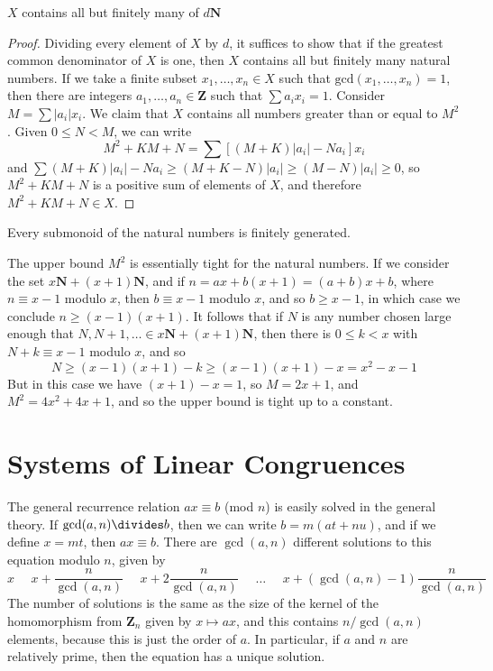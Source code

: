 \begin{theorem}
    $X$ contains all but finitely many of $d \mathbf{N}$
\end{theorem}
\begin{proof}
    Dividing every element of $X$ by $d$, it suffices to show that if the greatest common denominator of $X$ is one, then $X$ contains all but finitely many natural numbers. If we take a finite subset $x_1, \dots, x_n \in X$ such that $\text{gcd}(x_1, \dots, x_n) = 1$, then there are integers $a_1, \dots, a_n \in \mathbf{Z}$ such that $\sum a_ix_i = 1$. Consider $M = \sum |a_i|x_i$. We claim that $X$ contains all numbers greater than or equal to $M^2$. Given $0 \leq N < M$, we can write
    \[ M^2 + KM + N = \sum \left[ (M+K)|a_i| - Na_i \right] x_i \]
    and $\sum (M+K)|a_i| - Na_i \geq (M+K-N)|a_i| \geq (M-N)|a_i| \geq 0$, so $M^2 + KM + N$ is a positive sum of elements of $X$, and therefore $M^2 + KM + N \in X$.
\end{proof}

\begin{corollary}
    Every submonoid of the natural numbers is finitely generated.
\end{corollary}

\begin{example}
    The upper bound $M^2$ is essentially tight for the natural numbers. If we consider the set $x\mathbf{N} + (x+1)\mathbf{N}$, and if $n = ax + b(x+1) = (a+b)x + b$, where $n \equiv x-1$ modulo $x$, then $b \equiv x-1$ modulo $x$, and so $b \geq x-1$, in which case we conclude $n \geq (x-1)(x+1)$. It follows that if $N$ is any number chosen large enough that $N,N+1,\dots \in x\mathbf{N} + (x+1)\mathbf{N}$, then there is $0 \leq k < x$ with $N+k \equiv x-1$ modulo $x$, and so
    \[ N \geq (x-1)(x+1) - k \geq (x-1)(x+1) - x = x^2 - x - 1 \]
    But in this case we have $(x+1)-x = 1$, so $M = 2x + 1$, and $M^2 = 4x^2 + 4x + 1$, and so the upper bound is tight up to a constant.
\end{example}

\section{Systems of Linear Congruences}

The general recurrence relation $ax \equiv b$ (mod $n$) is easily solved in the general theory. If $\gcd(a,n) \divides b$, then we can write $b = m(at + nu)$, and if we define $x = mt$, then $ax \equiv b$. There are $\gcd(a,n)$ different solutions to this equation modulo $n$, given by
%
\[ x\ \ \ \ \ \ x + \frac{n}{\gcd(a,n)}\ \ \ \ \ \ x + 2 \frac{n}{\gcd(a,n)}\ \ \ \ \ \ \dots\ \ \ \ \ \ x + (\gcd(a,n) - 1) \frac{n}{\gcd(a,n)} \]
%
The number of solutions is the same as the size of the kernel of the homomorphism from $\mathbf{Z}_n$ given by $x \mapsto ax$, and this contains $n/\gcd(a,n)$ elements, because this is just the order of $a$. In particular, if $a$ and $n$ are relatively prime, then the equation has a unique solution.

